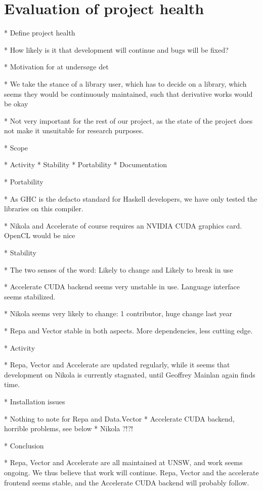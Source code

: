 \chapter{Evaluation of project health}
\label{chap:project-health}

* Define project health
  
  * How likely is it that development will continue and bugs will be fixed?

* Motivation for at undersøge det
  
  * We take the stance of a library user, which has to decide on
    a library, which seems they would be continuously maintained, such
    that derivative works would be okay

  * Not very important for the rest of our project, as the state of
    the project does not make it unsuitable for research purposes.

* Scope
  
  * Activity
  * Stability
  * Portability
  * Documentation

* Portability 
  
  * As GHC is the defacto standard for Haskell developers, we have
    only tested the libraries on this compiler.

  * Nikola and Accelerate of course requires an NVIDIA CUDA graphics
    card. OpenCL would be nice

* Stability 
  
  * The two senses of the word: Likely to change and Likely to break in use

  * Accelerate CUDA backend seems very unstable in use. Language
    interface seems stabilized.

  * Nikola seems very likely to change: 1 contributor, huge change
    last year

  * Repa and Vector stable in both aspects. More dependencies,
    less cutting edge.

* Activity

  * Repa, Vector and Accelerate are updated regularly, while it seems
    that development on Nikola is currently stagnated, until Geoffrey
    Mainlan again finds time.

* Installation issues

  * Nothing to note for Repa and Data.Vector
  * Accelerate CUDA backend, horrible problems, see below
  * Nikola ?!?!

* Conclusion

  * Repa, Vector and Accelerate are all maintained at UNSW, and work
    seems ongoing. We thus believe that work will continue. Repa, Vector
    and the accelerate frontend seems stable, and the Accelerate CUDA
    backend will probably follow.

